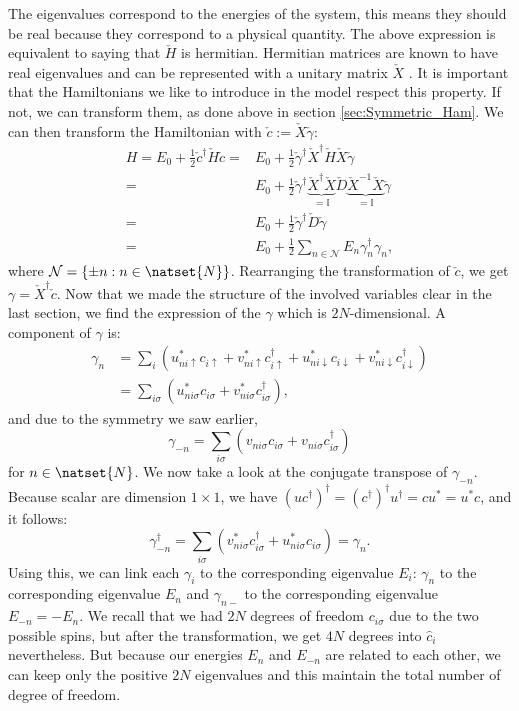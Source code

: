 \documentclass[../main.tex]{subfile}
\begin{document}
The eigenvalues correspond to the energies of the system, this means they should be real because they correspond to a physical quantity. The above expression
is equivalent to saying that $\check{H}$ is hermitian. Hermitian matrices are known to have real eigenvalues and can be represented with a unitary matrix $\check{X}$ \cite{Terence}.
It is important that the Hamiltonians we like to introduce in the model respect this property. If not, we can transform them, as done above in section \ref{sec:Symmetric_Ham}. 
We can then transform the Hamiltonian with $\check{c} := \check{X}\check{\gamma}$:
\begin{align*}
    H = E_0 + \frac{1}{2}\check{c}^{\dagger}\check{H}\check{c} =& E_0 + \frac{1}{2}\check{\gamma}^{\dagger}\check{X}^{\dagger}\check{H}\check{X}\check{\gamma}\\
    =& E_0 +\frac{1}{2}\check{\gamma}^{\dagger}\underbrace{\check{X}^{\dagger} \check{X}}_{=\mathbb{I}}\check{D}\underbrace{\check{X}^{-1}\check{X}}_{=\mathbb{I}}\check{\gamma}\\
    =& E_0 + \frac{1}{2}\check{\gamma}^{\dagger}\check{D}\check{\gamma}\\
    =& E_0 + \frac{1}{2}\sum_{n\in\mathcal{N}}E_n \gamma_n^{\dagger}\gamma_n,
\end{align*}
where $\mathcal{N}= \{\pm n : n \in \natset{N}\}$.
Rearranging the transformation of $\check{c}$, we get $\gamma = \check{X}^{\dagger}\check{c}$.   
Now that we made the structure of the involved variables clear in the last section, we find the expression of the $\gamma$ which is $2N$-dimensional. A component of $\gamma$ is:
\begin{align*}
    \gamma_n &= \sum_{i} \left( u_{ni\uparrow}^{\ast}c_{i\uparrow}+ v_{ni\uparrow}^{\ast}c_{i\uparrow}^{\dagger} +  u_{ni\downarrow}^{\ast}c_{i\downarrow}+ v_{ni\downarrow}^{\ast}c_{i\downarrow}^{\dagger}\right)\\
        &=  \sum_{i\sigma} \left( u_{ni\sigma}^{\ast}c_{i\sigma}+ v_{ni\sigma}^{\ast}c_{i\sigma}^{\dagger}\right),
\end{align*}
and due to the symmetry we saw earlier, 
\[
    \gamma_{-n} =  \sum_{i\sigma} \left( v_{ni\sigma}c_{i\sigma}+ v_{ni\sigma}c_{i\sigma}^{\dagger}\right)
\]
for $n\in \natset{N}$. We now take a look at the conjugate transpose of $\gamma_{-n}$. Because scalar are dimension $1\times1$, we have 
$(uc^{\dagger})^{\dagger} = (c^{\dagger})^{\dagger} u^{\dagger} =  c u^{\ast} = u^{\ast}c$, and it follows:
\[
    \gamma_{-n}^{\dagger} = \sum_{i\sigma} \left( v_{ni\sigma}^{\ast}c_{i\sigma}^{\dagger}+ u_{ni\sigma}^{\ast}c_{i\sigma}\right) = \gamma_n.
\]
Using this, we can link each $\gamma_i$ to the corresponding eigenvalue $E_i$:  $\gamma_n$ to the corresponding eigenvalue $E_n$ and $\gamma_{n-}$ 
to the corresponding eigenvalue $E_{-n} = -E_n$.
We recall that we had $2N$ degrees of freedom $c_{i\sigma}$ due
to the two possible spins, but after the transformation, we get $4N$ degrees into $\hat{c}_i$ nevertheless. 
But because our energies $E_n$ and $E_{-n}$ are related to each other, we can keep only the positive $2N$ eigenvalues
and this maintain the total number of degree of freedom.\\
\end{document}
